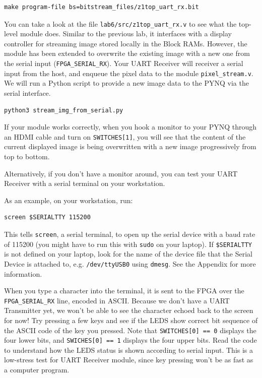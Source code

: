 \documentclass[11pt]{article}
\begin{document}
\begin{verbatim}
make program-file bs=bitstream_files/z1top_uart_rx.bit
\end{verbatim}

You can take a look at the file \verb|lab6/src/z1top_uart_rx.v| to see what the top-level module does. Similar to the previous lab, it interfaces with a display controller for streaming image stored locally in the Block RAMs. However, the module has been extended to overwrite the existing image with a new one from the serial input (\verb|FPGA_SERIAL_RX|). Your UART Receiver will receiver a serial input from the host, and enqueue the pixel data to the module \verb|pixel_stream.v|. We will run a Python script to provide a new image data to the PYNQ via the serial interface.

\begin{verbatim}
python3 stream_img_from_serial.py
\end{verbatim}

If your module works correctly, when you hook a monitor to your PYNQ through an HDMI cable and turn on \verb|SWITCHES[1]|, you will see that the content of the current displayed image is being overwritten with a new image progressively from top to bottom.

Alternatively, if you don't have a monitor around, you can test your UART Receiver with a serial terminal on your workstation.

As an example, on your workstation, run:

\begin{verbatim}
screen $SERIALTTY 115200
\end{verbatim}

This tells \verb|screen|, a serial terminal, to open up the serial device with a baud rate of 115200 (you might have to run this with \verb|sudo| on your laptop). If \verb|$SERIALTTY| is not defined on your laptop, look for the name of the device file that the Serial Device is attached to, e.g. \verb|/dev/ttyUSB0| using \texttt{dmesg}. See the Appendix for more information.

When you type a character into the terminal, it is sent to the FPGA over the \verb|FPGA_SERIAL_RX| line, encoded in ASCII. Because we don't have a UART Transmitter yet, we won't be able to see the character echoed back to the screen for now! Try pressing a few keys and see if the LEDS show correct bit sequence of the ASCII code of the key you pressed. Note that \verb|SWITCHES[0] == 0| displays the four lower bits, and \verb|SWICHES[0] == 1| displays the four upper bits. Read the code to understand how the LEDS status is shown according to serial input. This is a low-stress test for UART Receiver module, since key pressing won't be as fast as a computer program.
\end{document}
